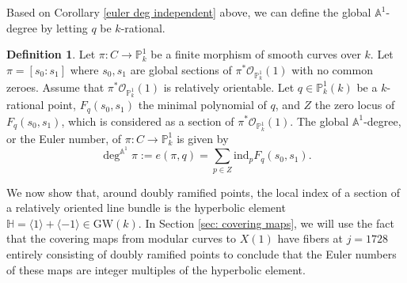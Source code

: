 \documentclass[12pt, reqno]{amsart}
\theoremstyle{definition}
\newtheorem{definition}[theorem]{Definition}
\newcommand{\A}{\mathbb{A}} %
\newcommand{\Proj}{\mathbb{P}} %
\newcommand{\Adeg}{\deg^{\mathbb{A}^1}} %
\newcommand{\Oh}{\mathscr{O}} %
\newcommand{\ind}{\mathrm{ind}} %
\begin{document}
Based on Corollary \ref{euler deg independent} above, we can define the global $\A^1$-degree by letting $q$ be $k$-rational.

\begin{definition} \label{naiveEulerequiv}
Let $\pi: C \to \Proj^1_k$ be a finite morphism of smooth curves over $k$. Let $\pi = [s_0: s_1]$ where $s_0, s_1$ are global sections of $\pi^* \Oh_{\Proj^1_k}(1)$ with no common zeroes. Assume that $\pi^* \Oh_{\Proj^1_k}(1)$ is relatively orientable. Let $q \in \Proj^1_k(k)$ be a $k$-rational point, $F_q(s_0,s_1)$ the minimal polynomial of $q$, and $Z$ the zero locus of $F_q(s_0,s_1)$, which is considered as a section of $\pi^* \Oh_{\Proj^1_k}(1)$. The global $\A^1$-degree, or the Euler number, of $\pi: C \to \mathbb{P}^1_k$ is given by
\begin{equation*}
    \Adeg \pi := e(\pi, q) = \sum_{p \in Z} \ind_{p} F_q(s_0, s_1).
\end{equation*}
\end{definition}


We now show that, around doubly ramified points, the local index of a section of a relatively oriented line bundle is the hyperbolic element $\mathbb{H} = \langle 1 \rangle + \langle -1 \rangle \in \text{GW}(k)$. In Section \ref{sec: covering maps}, we will use the fact that the covering maps from modular curves to $X(1)$ 
have fibers at $j = 1728$ entirely consisting of doubly ramified points to conclude that the Euler numbers of these maps are integer multiples of the hyperbolic element. 
\end{document}
